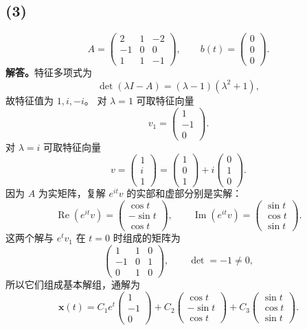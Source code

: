 \documentclass[11pt,a4paper]{ctexart}
\newcommand{\xx}{\boldsymbol{x}}
\begin{document}
\newpage
\subsection*{(3)}
\[
A=\begin{pmatrix}2&1&-2\\-1&0&0\\1&1&-1\end{pmatrix},\qquad
b(t)=\begin{pmatrix}0\\0\\0\end{pmatrix}.
\]
\textbf{解答。}特征多项式为
\[
\det(\lambda I-A)=(\lambda-1)(\lambda^2+1),
\]
故特征值为 $1,i,-i$。
对 $\lambda=1$ 可取特征向量
\[
v_1=\begin{pmatrix}1\\-1\\0\end{pmatrix}.
\]
对 $\lambda=i$ 可取特征向量
\[
v=\begin{pmatrix}1\\i\\1\end{pmatrix}
=\begin{pmatrix}1\\0\\1\end{pmatrix}
+i\begin{pmatrix}0\\1\\0\end{pmatrix}.
\]
因为 $A$ 为实矩阵，复解 $e^{it}v$ 的实部和虚部分别是实解：
\[
\operatorname{Re}(e^{it}v)=\begin{pmatrix}\cos t\\-\sin t\\\cos t\end{pmatrix},
\qquad
\operatorname{Im}(e^{it}v)=\begin{pmatrix}\sin t\\\cos t\\\sin t\end{pmatrix}.
\]
这两个解与 $e^tv_1$ 在 $t=0$ 时组成的矩阵为
\[
\begin{pmatrix}1&1&0\\-1&0&1\\0&1&0\end{pmatrix},
\qquad \det=-1\ne0,
\]
所以它们组成基本解组，通解为
\[
\boxed{\xx(t)=C_1e^t\begin{pmatrix}1\\-1\\0\end{pmatrix}
+C_2\begin{pmatrix}\cos t\\-\sin t\\\cos t\end{pmatrix}
+C_3\begin{pmatrix}\sin t\\\cos t\\\sin t\end{pmatrix}.}
\]
\end{document}
